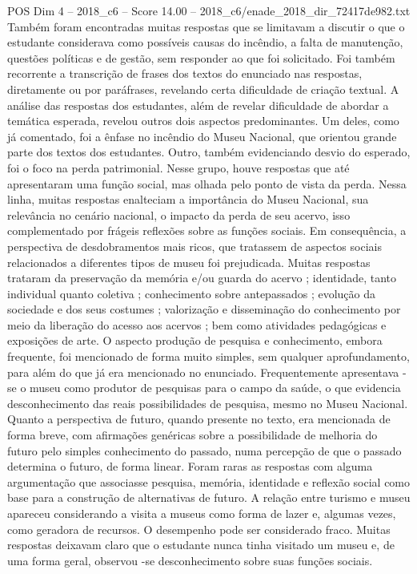 \begin{textsample}{POS Dim 4 – 2018\_c6 – Score 14.00 – 2018\_c6/enade\_2018\_dir\_72417de982.txt}
Também foram encontradas muitas respostas que se limitavam a discutir o que o estudante considerava como possíveis causas do incêndio, a falta de manutenção, questões políticas e de gestão, sem responder ao que foi solicitado.
Foi também recorrente a transcrição de frases dos textos do enunciado nas respostas, diretamente ou por paráfrases, revelando certa dificuldade de criação textual.
A análise das respostas dos estudantes, além de revelar dificuldade de abordar a temática esperada, revelou outros dois aspectos predominantes.
Um deles, como já comentado, foi a ênfase no incêndio do Museu Nacional, que orientou grande parte dos textos dos estudantes.
Outro, também evidenciando desvio do esperado, foi o foco na perda patrimonial.
Nesse grupo, houve respostas que até apresentaram uma função social, mas olhada pelo ponto de vista da perda.
Nessa linha, muitas respostas enalteciam a importância do Museu Nacional, sua relevância no cenário nacional, o impacto da perda de seu acervo, isso complementado por frágeis reflexões sobre as funções sociais.
Em consequência, a perspectiva de desdobramentos mais ricos, que tratassem de aspectos sociais relacionados a diferentes tipos de museu foi prejudicada.
Muitas respostas trataram da preservação da memória e/ou guarda do acervo ; identidade, tanto individual quanto coletiva ; conhecimento sobre antepassados ; evolução da sociedade e dos seus costumes ; valorização e disseminação do conhecimento por meio da liberação do acesso aos acervos ; bem como atividades pedagógicas e exposições de arte.
O aspecto produção de pesquisa e conhecimento, embora frequente, foi mencionado de forma muito simples, sem qualquer aprofundamento, para além do que já era mencionado no enunciado.
Frequentemente apresentava -se o museu como produtor de pesquisas para o campo da saúde, o que evidencia desconhecimento das reais possibilidades de pesquisa, mesmo no Museu Nacional.
Quanto a perspectiva de futuro, quando presente no texto, era mencionada de forma breve, com afirmações genéricas sobre a possibilidade de melhoria do futuro pelo simples conhecimento do passado, numa percepção de que o passado determina o futuro, de forma linear.
Foram raras as respostas com alguma argumentação que associasse pesquisa, memória, identidade e reflexão social como base para a construção de alternativas de futuro.
A relação entre turismo e museu apareceu considerando a visita a museus como forma de lazer e, algumas vezes, como geradora de recursos.
O desempenho pode ser considerado fraco.
Muitas respostas deixavam claro que o estudante nunca tinha visitado um museu e, de uma forma geral, observou -se desconhecimento sobre suas funções sociais.

\end{textsample}
